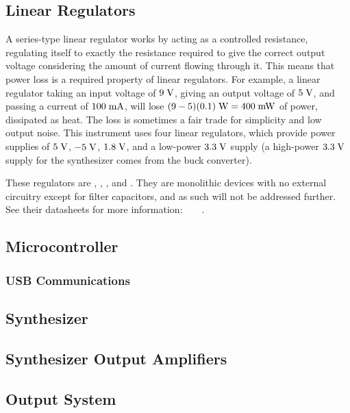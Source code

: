 \subsection{Linear Regulators}
A series-type linear regulator works by acting as a controlled resistance,
regulating itself to exactly the resistance required to give the correct
output voltage considering the amount of current flowing through it. This
means that power loss is a required property of linear regulators. For example,
a linear regulator taking an input voltage of $9\;\mathrm{V}$, giving an output
voltage of $5\;\mathrm{V}$, and passing a current of $100\;\mathrm{mA}$, will
lose $(9-5)(0.1)\;\mathrm{W} = 400\;\mathrm{mW}$ of power, dissipated as heat.
The loss is sometimes a fair trade for simplicity and low output noise.
This instrument uses four linear regulators, which provide power supplies
of $5\;\mathrm{V}$, $-5\;\mathrm{V}$, $1.8\;\mathrm{V}$, and a low-power $3.3\;\mathrm{V}$
supply (a high-power $3.3\;\mathrm{V}$ supply for the synthesizer comes from
the buck converter).

These regulators are , , , and .
They are monolithic devices with no external circuitry except for filter
capacitors, and as such will not be addressed further. See their datasheets for
more information:~\cite{l78m05}~\cite{mc79m00}~\cite{az1117c}~\cite{mcp1700}.

\subsection{Microcontroller}
\subsubsection{USB Communications}

\subsection{Synthesizer}

\subsection{Synthesizer Output Amplifiers}

\subsection{Output System}


